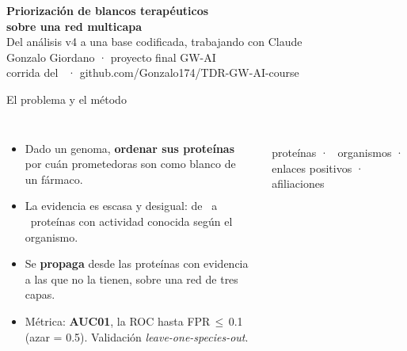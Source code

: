 \documentclass[aspectratio=169,11pt]{beamer}
\begin{document}
\begin{frame}[plain]
\vspace{2.2em}
{\color{tinta}\bfseries\LARGE Priorización de blancos terapéuticos\\[.2em]
sobre una red multicapa}\\[1em]
{\large\color{tinta2}Del análisis v4 a una base codificada, trabajando con Claude}\\[2.2em]
{\small Gonzalo Giordano · proyecto final GW-AI}\\[.3em]
{\scriptsize\color{tenue}corrida del \FechaCorrida\ · github.com/Gonzalo174/TDR-GW-AI-course}
\end{frame}

\begin{frame}{El problema y el método}
\begin{columns}[T]
\begin{itemize}\setlength\itemsep{.55em}
\item Dado un genoma, \textbf{ordenar sus proteínas} por cuán prometedoras son
  como blanco de un fármaco.
\item La evidencia es escasa y desigual: de \DrugMin\ a \DrugMax\ proteínas con
  actividad conocida según el organismo.
\item Se \textbf{propaga} desde las proteínas con evidencia a las que no la
  tienen, sobre una red de tres capas.
\item Métrica: \textbf{AUC01}, la ROC hasta FPR\,$\le$\,0.1 (azar = 0.5).
  Validación \emph{leave-one-species-out}.
\end{itemize}
\centering
{}\\[.6em]
{\scriptsize\color{tinta2}\NProteinas\ proteínas · \NEspecies\ organismos ·
\NPositivos\ enlaces positivos · \NAfiliaciones\ afiliaciones}
\end{columns}
\end{frame}
\end{document}
